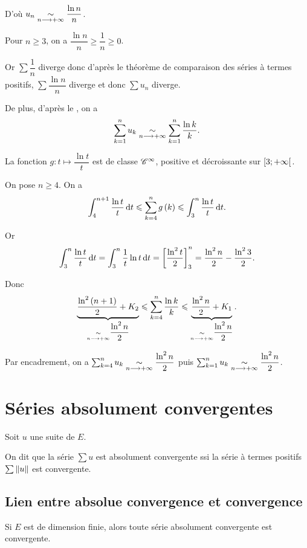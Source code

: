 \begin{corr}
D'où \(u_n\underset{n\longrightarrow+\infty}{\sim}\dfrac{\ln n}{n}\).

Pour \(n\geq3\), on a \(\dfrac{\ln n}{n}\geq\dfrac{1}{n}\geq0\).

Or \(\sum\dfrac{1}{n}\) diverge donc d'après le théorème de comparaison des séries à termes positifs, \(\sum\dfrac{\ln n}{n}\) diverge et donc \(\sum u_n\) diverge.

De plus, d'après le , on a \[\sum_{k=1}^nu_k\underset{n\longrightarrow+\infty}{\sim}\sum_{k=1}^n\dfrac{\ln k}{k}.\]

La fonction \(g:t\mapsto\dfrac{\ln t}{t}\) est de classe \(\mathscr{C}^{\infty}\), positive et décroissante sur \(\left[3;+\infty\right[\).

On pose \(n\geq4\). On a \[\int_4^{n+1}\dfrac{\ln t}{t}\odif{t}\leq\sum_{k=4}^ng\paren{k}\leq\int_3^n\dfrac{\ln t}{t}\odif{t}.\]

Or \[\int_3^n\dfrac{\ln t}{t}\odif{t}=\int_3^n\dfrac{1}{t}\ln t\odif{t}=\croch{\dfrac{\ln^2t}{2}}_3^n=\dfrac{\ln^2n}{2}-\dfrac{\ln^23}{2}.\]

Donc \[\underbrace{\dfrac{\ln^2\left(n+1\right)}{2}+K_2}_{\underset{n\longrightarrow+\infty}{\sim}\dfrac{\ln^2n}{2}}\leqslant\sum_{k=4}^n\dfrac{\ln k}{k}\leqslant\underbrace{\dfrac{\ln^2n}{2}+K_1}_{\underset{n\longrightarrow+\infty}{\sim}\dfrac{\ln^2n}{2}}.\]

Par encadrement, on a \(\sum_{k=4}^nu_k\underset{n\longrightarrow+\infty}{\sim}\dfrac{\ln^2n}{2}\) puis \(\sum_{k=1}^nu_k\underset{n\longrightarrow+\infty}{\sim}\dfrac{\ln^2n}{2}\).
\end{corr}

\section{Séries absolument convergentes}

\begin{defi}
Soit \(u\) une suite de \(E\).

On dit que la série \(\sum u\) est absolument convergente ssi la série à termes positifs \(\sum\norme{u}\) est convergente.
\end{defi}

\subsection{Lien entre absolue convergence et convergence}

\begin{theo}
Si \(E\) est de dimension finie, alors toute série absolument convergente est convergente.
\end{theo}

